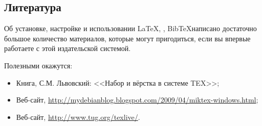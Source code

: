 \subsection{Литература}
	Об установке, настройке и использовании \LaTeX, \XeLaTeX, Bib\TeX написано
	достаточно большое количество материалов, которые могут пригодиться, если вы
	впервые работаете с этой издательской системой.\par
	Полезными окажутся:
	\begin{itemize}
	  \item Книга, С.М. Львовский: <<Набор и вёрстка в системе TEX>>;
	  \item Веб-сайт,
	  \url{http://mydebianblog.blogspot.com/2009/04/miktex-windows.html};
	  \item Веб-сайт, \url{http://www.tug.org/texlive/}.
	\end{itemize}

